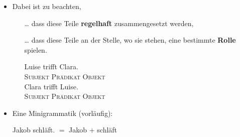\begin{frame}

\begin{itemize}
\item Dabei ist zu beachten, 

\begin{itemize}

	\item [\dots] dass diese Teile \textbf{regelhaft} zusammengesetzt werden,

	\eal 
	\zl

\pause

	\item [\dots] dass diese Teile an der Stelle, wo sie stehen, eine bestimmte \textbf{Rolle} spielen.
	
	\ea 		
		\ea
		\gll Luise trifft Clara.\\
		\textsc{Subjekt} \textsc{Prädikat} \textsc{Objekt}\\
		
		\ex 
		\gll Clara trifft Luise.\\
		\textsc{Subjekt} \textsc{Prädikat} \textsc{Objekt}\\
		\z
	\z 
\end{itemize}

\end{itemize}

\end{frame}


\begin{frame}

\begin{itemize}
	\item Eine Minigrammatik (vorläufig):

	\eal 
	\ex Jakob schläft. $=$ Jakob $+$ schläft
{}

{}
	
{}

{}	

{}
	
{}	

{}
\end{itemize}

\end{frame}


